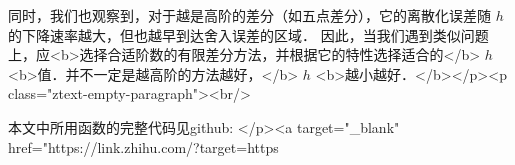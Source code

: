 同时，我们也观察到，对于越是高阶的差分（如五点差分），它的离散化误差随  $h$  的下降速率越大，但也越早到达舍入误差的区域． 因此，当我们遇到类似问题上，应<b>选择合适阶数的有限差分方法，并根据它的特性选择适合的</b>  $h$  <b>值．并不一定是越高阶的方法越好，</b>  $h$  <b>越小越好．</b></p><p class="ztext-empty-paragraph"><br/>

本文中所用函数的完整代码见github: </p><a target="_blank" href="https://link.zhihu.com/?target=https%